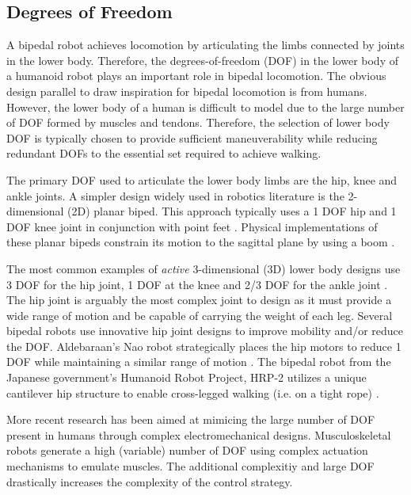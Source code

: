 \subsection{Degrees of Freedom} %
\label{sub:related_degrees_of_freedom}
A bipedal robot achieves locomotion by articulating the limbs connected by joints in the lower body. Therefore, the degrees-of-freedom (DOF) in the lower body of a humanoid robot plays an important role in bipedal locomotion. The obvious design parallel to draw inspiration for bipedal locomotion is from humans. However, the lower body of a human is difficult to model due to the large number of DOF formed by muscles and tendons. Therefore, the selection of lower body DOF is typically chosen to provide sufficient maneuverability while reducing redundant DOFs to the essential set required to achieve walking. 

The primary DOF used to articulate the lower body limbs are the hip, knee and ankle joints. A simpler design widely used in robotics literature is the 2-dimensional (2D) planar biped. This approach typically uses a 1 DOF hip and 1 DOF knee joint in conjunction with point feet \cite{tzafestas1996robust}. Physical implementations of these planar bipeds constrain its motion to the sagittal plane by using a boom \cite{chevallereau2000design,pratt2001virtual,Wight:2008vt}. 

The most common examples of \emph{active} 3-dimensional (3D) lower body designs use 3 DOF for the hip joint, 1 DOF at the knee and 2/3 DOF for the ankle joint \cite{Hirai1998,IllWooPark:2005et,Kaneko:2004wq,Ogura:2006bm,yamaguchi1999}. The hip joint is arguably the most complex joint to design as it must provide a wide range of motion and be capable of carrying the weight of each leg. Several bipedal robots use innovative hip joint designs to improve mobility and/or reduce the DOF. Aldebaraan's Nao robot strategically places the hip motors to reduce 1 DOF while maintaining a similar range of motion \cite{Gouaillier:2008ug}. The bipedal robot from the Japanese government's Humanoid Robot Project, HRP-2 utilizes a unique cantilever hip structure to enable cross-legged walking (i.e. on a tight rope) \cite{Kaneko:2004wq}. 

More recent research has been aimed at mimicing the large number of DOF present in humans through complex electromechanical designs. Musculoskeletal robots \cite{Mizuuchi:2007em,Osada:2010cj} generate a high (variable) number of DOF using complex actuation mechanisms to emulate muscles. The additional complexitiy and large DOF drastically increases the complexity of the control strategy. 

